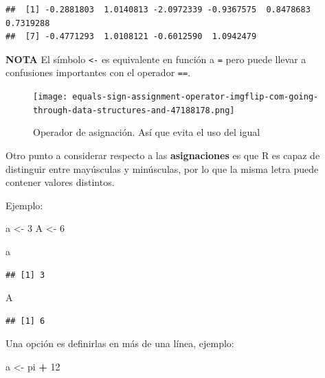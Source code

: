 \documentclass[
]{book}
\newenvironment{Shaded}{\begin{snugshade}}{\end{snugshade}}
\newcommand{\DecValTok}[1]{\textcolor[rgb]{0.00,0.00,0.81}{#1}}
\newcommand{\NormalTok}[1]{#1}
\newcommand{\OtherTok}[1]{\textcolor[rgb]{0.56,0.35,0.01}{#1}}
\newcommand{\SpecialCharTok}[1]{\textcolor[rgb]{0.81,0.36,0.00}{\textbf{#1}}}
\begin{document}
\begin{verbatim}
##  [1] -0.2881803  1.0140813 -2.0972339 -0.9367575  0.8478683  0.7319288
##  [7] -0.4771293  1.0108121 -0.6012590  1.0942479
\end{verbatim}

\textbf{NOTA} El símbolo \texttt{\textless{}-} es equivalente en función a \texttt{=} pero puede llevar a confusiones importantes con el operador \texttt{==}.

\begin{figure}
\centering
\texttt{[image: equals-sign-assignment-operator-imgflip-com-going-through-data-structures-and-47188178.png]}
\caption{Operador de asignación. Así que evita el uso del igual}
\end{figure}

Otro punto a considerar respecto a las \textbf{asignaciones} es que R es capaz de distinguir entre mayúsculas y minúsculas, por lo que la misma letra puede contener valores distintos.

Ejemplo:

\begin{Shaded}
\begin{Highlighting}[]
\NormalTok{a }\OtherTok{\textless{}{-}} \DecValTok{3}
\NormalTok{A }\OtherTok{\textless{}{-}} \DecValTok{6}
\end{Highlighting}
\end{Shaded}

\begin{Shaded}
\begin{Highlighting}[]
\NormalTok{a}
\end{Highlighting}
\end{Shaded}

\begin{verbatim}
## [1] 3
\end{verbatim}

\begin{Shaded}
\begin{Highlighting}[]
\NormalTok{A}
\end{Highlighting}
\end{Shaded}

\begin{verbatim}
## [1] 6
\end{verbatim}

Una opción es definirlas en más de una línea, ejemplo:

\begin{Shaded}
\begin{Highlighting}[]
\NormalTok{a }\OtherTok{\textless{}{-}}
\NormalTok{  pi }\SpecialCharTok{+} \DecValTok{12}
\end{Highlighting}
\end{Shaded}
\end{document}
